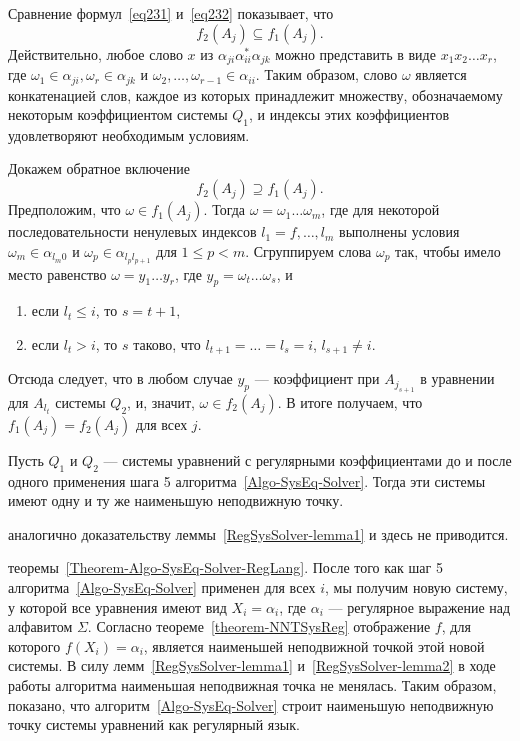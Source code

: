 \begin{myproof}
Сравнение формул~\eqref{eq231} и~\eqref{eq232} показывает, что
\[
	f_2(A_j)\subseteq f_1(A_j).
\]
Действительно, любое слово $x$ из $\alpha_{ji}\alpha^*_{ii}\alpha_{jk}$ можно представить в виде $x_1x_2\ldots x_r$, где $\omega_1\in\alpha_{ji}, \omega_r\in\alpha_{jk}$ и $\omega_2,\ldots ,\omega_{r-1}\in\alpha_{ii}$. Таким образом, слово $\omega$ является конкатенацией слов, каждое из которых принадлежит множеству, обозначаемому некоторым коэффициентом системы $Q_1$, и индексы этих коэффициентов удовлетворяют необходимым условиям.

	Докажем обратное включение
\[
	f_2(A_j)\supseteq f_1(A_j).
\]
Предположим, что $\omega\in f_1(A_j)$. Тогда $\omega=\omega_1\ldots\omega_m$, где для некоторой последовательности ненулевых индексов $l_1=f,\ldots ,l_m$ выполнены условия $\omega_m\in\alpha_{l_m0}$ и $\omega_p\in\alpha_{l_{p}l_{p+1}}$ для $1\le p<m$. Сгруппируем слова $\omega_p$ так, чтобы имело место равенство $\omega=y_1\ldots y_r$, где $y_p=\omega_t\ldots\omega_s$, и
\begin{enumerate}
	\item если $l_t\le i$, то $s=t+1$,
	\item если $l_t>i$, то $s$ таково, что $l_{t+1}=\ldots =l_s=i$, $l_{s+1}\neq i$.
\end{enumerate}
Отсюда следует, что в любом случае $y_p$ --- коэффициент при $A_{j_{s+1}}$ в уравнении для $A_{l_t}$ системы $Q_2$, и, значит, $\omega\in f_2(A_j)$. В итоге получаем, что $f_1(A_j)=f_2(A_j)$ для всех $j$.
\end{myproof}

\begin{mylemma}
Пусть $Q_1$ и $Q_2$ --- системы уравнений с регулярными коэффициентами до и после одного применения шага 5 алгоритма~\ref{Algo-SysEq-Solver}. Тогда эти системы имеют одну и ту же наименьшую неподвижную точку.
\end{mylemma}

\begin{myproof}
аналогично доказательству леммы~\ref{RegSysSolver-lemma1} и здесь не приводится.
\end{myproof}

\begin{myproof}
теоремы~\ref{Theorem-Algo-SysEq-Solver-RegLang}. После того как шаг 5 алгоритма~\ref{Algo-SysEq-Solver} применен для всех $i$, мы получим новую систему, у которой все уравнения имеют вид $X_i=\alpha_i$, где $\alpha_i$ --- регулярное выражение над алфавитом $\Sigma$. Согласно теореме~\ref{theorem-NNTSysReg} отображение $f$, для которого $f(X_{i})=\alpha_{i}$, является наименьшей неподвижной точкой этой новой системы. В силу лемм~\ref{RegSysSolver-lemma1} и~\ref{RegSysSolver-lemma2} в ходе работы алгоритма наименьшая неподвижная точка не менялась. Таким образом, показано, что алгоритм~\ref{Algo-SysEq-Solver} строит наименьшую неподвижную точку системы уравнений как регулярный язык.
\end{myproof}

